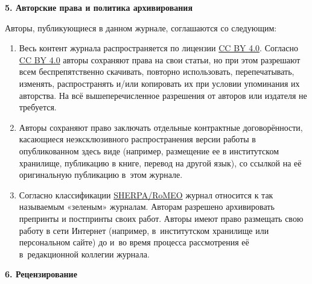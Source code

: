 \noindent

{\bf 5. Авторские права и политика архивирования}



\smallskip



Авторы, публикующиеся в данном журнале, соглашаются со следующим: 

\begin{enumerate}

\item[1.]  Весь контент журнала распространяется по лицензии \href{https://creativecommons.org/licenses/by/4.0/deed.ru}{CC BY 4.0}. Согласно \href{https://creativecommons.org/licenses/by/4.0/deed.ru}{CC BY 4.0} авторы сохраняют права на свои статьи, но при этом разрешают всем беспрепятственно скачивать, повторно использовать, перепечатывать, изменять, распространять и/или копировать их при условии упоминания их авторства. На всё вышеперечисленное разрешения от авторов или издателя не требуется.



\item[2.]  Авторы сохраняют право заключать отдельные контрактные договорённости, касающиеся неэксклюзивного распространения версии работы в опубликованном здесь виде (например, размещение ее в институтском хранилище, публикацию в книге, перевод на другой язык), со ссылкой на её оригинальную публикацию в~этом журнале.



\item[3.] Согласно классификации \href{http://www.sherpa.ac.uk/romeo/index.php}{SHERPA/RoMEO} журнал относится к так называемым «зеленым» журналам. Авторам разрешено архивировать препринты и постпринты своих работ. Авторы имеют право размещать свою работу в сети Интернет (например, в~институтском хранилище или персональном сайте) до и~во время процесса рассмотрения её в~редакционной коллегии журнала.



\end{enumerate}



\smallskip



\noindent

{\bf 6. Рецензирование}



